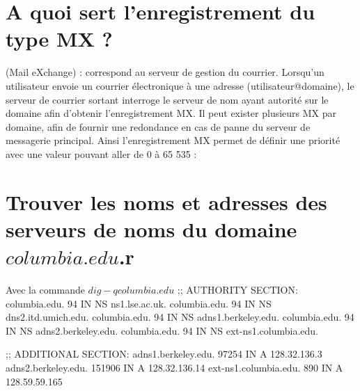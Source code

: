\section{A quoi sert l'enregistrement du type MX ?}
(Mail eXchange) : correspond au serveur de gestion du courrier. Lorsqu'un utilisateur envoie un courrier électronique à une adresse (utilisateur@domaine), le serveur de courrier sortant interroge le serveur de nom ayant autorité sur le domaine afin d'obtenir l'enregistrement MX. Il peut exister plusieurs MX par domaine, afin de fournir une redondance en cas de panne du serveur de messagerie principal. Ainsi l'enregistrement MX permet de définir une priorité avec une valeur pouvant aller de 0 à 65 535 : 
\section{Trouver les noms et adresses des serveurs de noms du domaine $columbia.edu$.r}
Avec la commande $dig -q columbia.edu$
;; AUTHORITY SECTION:
columbia.edu.		94	IN	NS	ns1.lse.ac.uk.
columbia.edu.		94	IN	NS	dns2.itd.umich.edu.
columbia.edu.		94	IN	NS	adns1.berkeley.edu.
columbia.edu.		94	IN	NS	adns2.berkeley.edu.
columbia.edu.		94	IN	NS	ext-ns1.columbia.edu.

;; ADDITIONAL SECTION:
adns1.berkeley.edu.	97254	IN	A	128.32.136.3
adns2.berkeley.edu.	151906	IN	A	128.32.136.14
ext-ns1.columbia.edu.	890	IN	A	128.59.59.165


